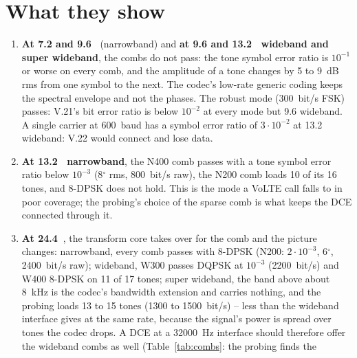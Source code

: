 \begin{table}[htbp]
\caption{The amplitude rings of clause~\ref{sec:qam}: per comb, the raw rate (bit/s) of the best loading of each tone with phase alone / with the rings (DQPSK, 8-DPSK, and 8-DPSK or DQPSK with two rings 6~dB apart or four 3~dB apart; a tone loaded where its phase and ring symbol error ratios are both below $2 \cdot 10^{-2}$), 20~ms symbol}
\label{tab:dapsk}
\centering\scriptsize
\resizebox{\textwidth}{!}{\tabdapsk}
\end{table}

\section{What they show}
\begin{enumerate}[label=\alph*)]
\item \textbf{At 7.2 and 9.6~\kbs{}} (narrowband) and \textbf{at 9.6 and
  13.2~\kbs{} wideband and super wideband}, the combs do not pass: the
  tone symbol error ratio is $10^{-1}$ or worse on every comb, and the
  amplitude of a tone changes by 5 to 9~dB rms from one symbol to the
  next.  The codec's low-rate generic coding keeps the spectral envelope
  and not the phases.  The robust mode (300~bit/s FSK) passes: V.21's
  bit error ratio is below $10^{-2}$ at every mode but 9.6 wideband.
  A single carrier at 600~baud has a symbol error ratio of $3 \cdot 10^{-2}$
  at 13.2 wideband: V.22 would connect and lose data.
\item \textbf{At 13.2~\kbs{} narrowband}, the N400 comb passes with a
  tone symbol error ratio below $10^{-3}$ (8$^\circ$ rms, 800~bit/s raw),
  the N200 comb loads 10 of its 16 tones, and 8-DPSK does not hold.  This
  is the mode a VoLTE call falls to in poor coverage; the probing's
  choice of the sparse comb is what keeps the DCE connected through it.
\item \textbf{At 24.4~\kbs{}}, the transform core takes over for the
  comb and the picture changes: narrowband, every comb passes with 8-DPSK
  (N200: $2 \cdot 10^{-3}$, 6$^\circ$, 2400~bit/s raw); wideband, W300
  passes DQPSK at $10^{-3}$ (2200~bit/s) and W400 8-DPSK on 11 of 17
  tones; super wideband, the band above about 8~kHz is the codec's
  bandwidth extension and carries nothing, and the probing loads 13 to
  15 tones (1300 to 1500~bit/s) -- less than the wideband interface gives
  at the same rate, because the signal's power is spread over tones the
  codec drops.  A DCE at a 32000~Hz interface should therefore offer the
  wideband combs as well (Table~\ref{tab:combs}: the probing finds the

\end{enumerate}
